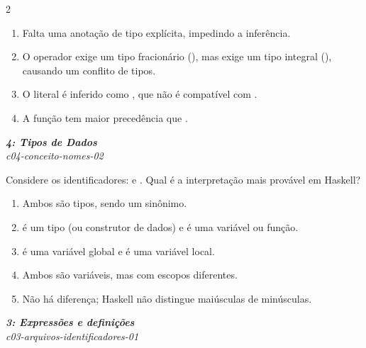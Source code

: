 \documentclass[a4paper,10pt,brazil]{article}
\begin{document}
\begin{multicols}{2}
\begin{enumerate}
  \item Falta uma anotação de tipo explícita, impedindo a inferência.

  \item O operador \haskellinline{/} exige um tipo fracionário (), mas  exige um tipo integral (), causando um conflito de tipos.

  \item O literal  é inferido como , que não é compatível com .

  \item A função  tem maior precedência que \haskellinline{/}.


\end{enumerate}

\begin{flushright}
  \footnotesize
  \textit{\textbf{4: Tipos de Dados}}\\
  \textit{c04-conceito-nomes-02}\\

\end{flushright}
Considere os identificadores:  e . Qual é a interpretação mais provável em Haskell?

\begin{enumerate}
  \item Ambos são tipos, sendo  um sinônimo.

  \item {} é um tipo (ou construtor de dados) e  é uma variável ou função.

  \item {} é uma variável global e  é uma variável local.

  \item Ambos são variáveis, mas com escopos diferentes.

  \item Não há diferença; Haskell não distingue maiúsculas de minúsculas.


\end{enumerate}

\begin{flushright}
  \footnotesize
  \textit{\textbf{3: Expressões e definições}}\\
  \textit{c03-arquivos-identificadores-01}\\


\end{flushright}
\end{multicols}
\end{document}
